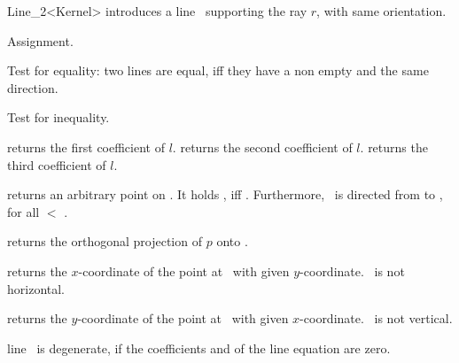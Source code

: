\begin{ccRefClass} {Line_2<Kernel>}
            {introduces a line \ccVar\ supporting the ray $r$,
            with same orientation.}

\ccOperations


\ccHidden {}
        {Assignment.}

       {Test for equality: two lines are equal, iff they have a non 
        empty  and the same direction.}

       {Test for inequality.}


       {returns the first coefficient of $l$.}
\ccGlue
{}
       {returns the second coefficient of $l$.}
\ccGlue
{}
       {returns the third coefficient of $l$.}

       {returns an arbitrary point on \ccVar. It holds 
        , iff .
        Furthermore, \ccVar\ is directed from 
        to , for all  $<$ .}

       {returns the orthogonal projection of $p$ onto \ccVar.}

       {returns the $x$-coordinate of the point at \ccVar\ with
        given $y$-coordinate.
        \ccPrecond \ccVar\ is not horizontal.}

       {returns the $y$-coordinate of the point at \ccVar\ with
        given $x$-coordinate.
        \ccPrecond \ccVar\ is not vertical.}


       {line \ccVar\ is degenerate, if the coefficients  and 
         of the line equation are zero.}

       {}
\ccGlue
{}
       {}


\end{ccRefClass}
